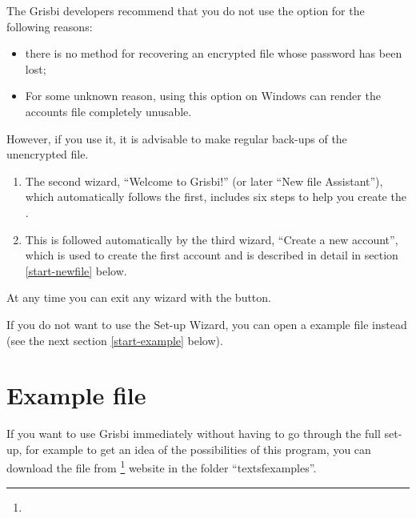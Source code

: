 The Grisbi developers recommend that you do not use the  option for the following reasons:
\begin{itemize}
	\item there is no method for recovering an encrypted file whose password has been lost;
	\item For some unknown reason, using this option on Windows can render the accounts file completely unusable.
\end{itemize} 
However, if you use it, it is advisable to make regular back-ups of the unencrypted file.

\begin{enumerate}[resume]
	\item The second wizard, \enquote{Welcome to Grisbi!} (or later \enquote{New file Assistant}), which automatically follows the first, includes six steps to help you create the .%
	\item This is followed automatically by the third wizard, \enquote{Create a new account}, which is used to create the first account and is described in detail in section \ref{start-newfile} below.%
\end{enumerate}

At any time you can exit any wizard with the  button.

If you do not want to use the Set-up Wizard, you can open a example file instead (see the next section \ref{start-example} below).



\section{Example file\label{start-example}}


If you want to use Grisbi immediately without having to go through the full set-up, for example to get an idea of the possibilities of this program, you can download the  file from \footnote{\urlSourceForgeDocumentation{}} website in the folder \enquote{textsf{examples}}.


